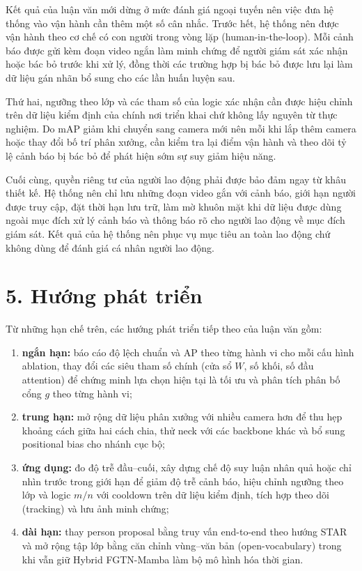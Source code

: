 Kết quả của luận văn mới dừng ở mức đánh giá ngoại tuyến nên việc đưa hệ thống vào vận hành cần thêm một số cân nhắc. Trước hết, hệ thống nên được vận hành theo cơ chế có con người trong vòng lặp (human-in-the-loop). Mỗi cảnh báo được gửi kèm đoạn video ngắn làm minh chứng để người giám sát xác nhận hoặc bác bỏ trước khi xử lý, đồng thời các trường hợp bị bác bỏ được lưu lại làm dữ liệu gán nhãn bổ sung cho các lần huấn luyện sau.

Thứ hai, ngưỡng theo lớp và các tham số của logic xác nhận cần được hiệu chỉnh trên dữ liệu kiểm định của chính nơi triển khai chứ không lấy nguyên từ thực nghiệm. Do mAP giảm khi chuyển sang camera mới nên mỗi khi lắp thêm camera hoặc thay đổi bố trí phân xưởng, cần kiểm tra lại điểm vận hành và theo dõi tỷ lệ cảnh báo bị bác bỏ để phát hiện sớm sự suy giảm hiệu năng.

Cuối cùng, quyền riêng tư của người lao động phải được bảo đảm ngay từ khâu thiết kế. Hệ thống nên chỉ lưu những đoạn video gắn với cảnh báo, giới hạn người được truy cập, đặt thời hạn lưu trữ, làm mờ khuôn mặt khi dữ liệu được dùng ngoài mục đích xử lý cảnh báo và thông báo rõ cho người lao động về mục đích giám sát. Kết quả của hệ thống nên phục vụ mục tiêu an toàn lao động chứ không dùng để đánh giá cá nhân người lao động.

\section*{5. Hướng phát triển}

Từ những hạn chế trên, các hướng phát triển tiếp theo của luận văn gồm:
\begin{enumerate}
  \item \textbf{ngắn hạn:} báo cáo độ lệch chuẩn và AP theo từng hành vi cho mỗi cấu hình ablation, thay đổi các siêu tham số chính (cửa sổ $W$, số khối, số đầu attention) để chứng minh lựa chọn hiện tại là tối ưu và phân tích phân bố cổng $g$ theo từng hành vi;
  \item \textbf{trung hạn:} mở rộng dữ liệu phân xưởng với nhiều camera hơn để thu hẹp khoảng cách giữa hai cách chia, thử neck với các backbone khác và bổ sung positional bias cho nhánh cục bộ;
  \item \textbf{ứng dụng:} đo độ trễ đầu--cuối, xây dựng chế độ suy luận nhân quả hoặc chỉ nhìn trước trong giới hạn để giảm độ trễ cảnh báo, hiệu chỉnh ngưỡng theo lớp và logic $m/n$ với cooldown trên dữ liệu kiểm định, tích hợp theo dõi (tracking) và lưu ảnh minh chứng;
  \item \textbf{dài hạn:} thay person proposal bằng truy vấn end-to-end theo hướng STAR và mở rộng tập lớp bằng căn chỉnh vùng--văn bản (open-vocabulary) trong khi vẫn giữ Hybrid FGTN-Mamba làm bộ mô hình hóa thời gian.
\end{enumerate}
\clearpage
